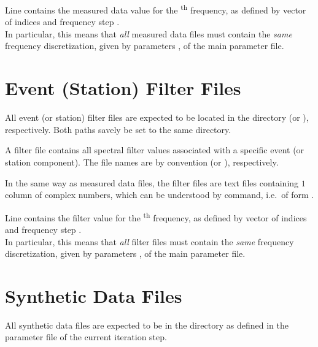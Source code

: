 Line  contains the measured data value for the \textsuperscript{th} frequency, as defined by vector
of indices  and frequency step . \\
In particular, this means that \emph{all} measured data files must contain the \emph{same} frequency discretization, given
by parameters ,  of the main 
parameter file.
%
\section{Event (Station) Filter Files} \label{files,sec:filters}
%
All event (or station) filter files are expected to be located in the directory  
(or ), respectively. Both paths savely be set to the same directory.

A filter file contains all spectral filter values associated with a specific event (or station component). 
The file names are by convention  (or ), respectively.

In the same way as measured data files, the filter files are text files containing $1$ column of 
 complex numbers, 
which can be understood by   command, i.e.\ of form  .

Line  contains the filter value for the \textsuperscript{th} frequency, as defined by vector
of indices  and frequency step . \\
In particular, this means that \emph{all} filter files must contain the \emph{same} frequency discretization, given
by parameters ,  of the main 
parameter file.
%
\section{Synthetic Data Files} \label{files,sec:synth_data} 
%
All synthetic data files are expected to be in the directory  as defined 
in the parameter file of the current iteration step.


